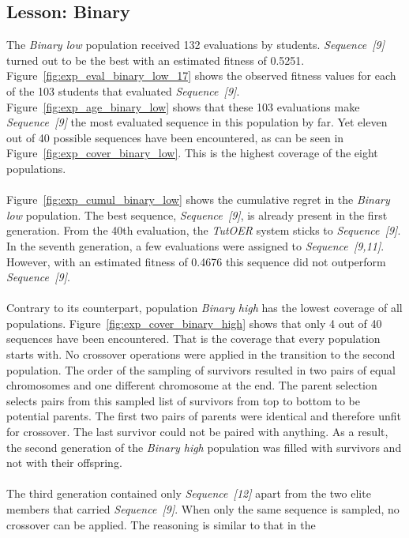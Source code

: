\subsection{Lesson: Binary}
\label{sec:results_binary}
The \emph{Binary low} population received 132 evaluations by students.
\emph{Sequence~[9]} turned out to be the best with an estimated fitness of
0.5251. Figure~\ref{fig:exp_eval_binary_low_17} shows the observed fitness
values for each of the 103 students that evaluated \emph{Sequence~[9]}.
Figure~\ref{fig:exp_age_binary_low} shows that these 103 evaluations make
\emph{Sequence~[9]} the most evaluated sequence in this population by far. Yet
eleven out of 40 possible sequences have been encountered, as can be seen in
Figure~\ref{fig:exp_cover_binary_low}. This is the highest coverage of the
eight populations.\\\\
\noindent
Figure~\ref{fig:exp_cumul_binary_low} shows the cumulative regret in the
\emph{Binary low} population. The best sequence, \emph{Sequence~[9]}, is
already present in the first generation. From the 40th evaluation, the \emph{TutOER}
system sticks to \emph{Sequence~[9]}. In the seventh generation, a few
evaluations were assigned to \emph{Sequence~[9,11]}. However, with an estimated
fitness of 0.4676 this sequence did not outperform \emph{Sequence~[9]}.\\\\
\noindent
Contrary to its counterpart, population \emph{Binary high} has the lowest
coverage of all populations. Figure~\ref{fig:exp_cover_binary_high} shows that
only 4 out of 40 sequences have been encountered. That is the coverage
that every population starts with. No crossover operations were applied in the
transition to the second population. The order of the sampling of survivors
resulted in two pairs of equal chromosomes and one different chromosome at the
end. The parent selection selects pairs from this sampled list of survivors
from top to bottom to be potential parents. The first two pairs of
parents were identical and therefore unfit for crossover. The last survivor
could not be paired with anything. As a result, the second generation of the
\emph{Binary high} population was filled with survivors and not with their
offspring.\\\\
\noindent
The third generation contained only \emph{Sequence~[12]} apart from the two
elite members that carried \emph{Sequence~[9]}. When only the same sequence is
sampled, no crossover can be applied. The reasoning is similar to that in the
